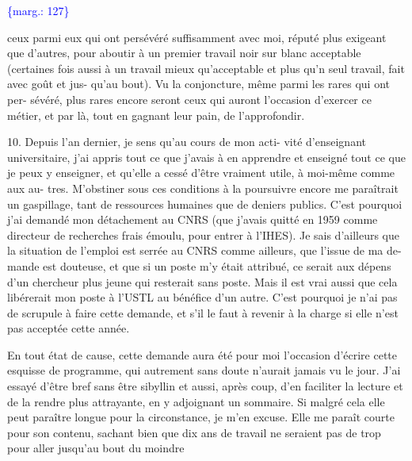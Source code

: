 \documentclass[11pt]{article}
\newcommand{\scanpage}[1]{\par\bigskip\noindent{\small\sffamily[scan #1]}\par}
\newcommand{\mspage}[1]{{\small\sffamily[p.\,#1]}}
\let\over\relax
\newcommand{\over}[2]{\textcolor{gray}{#1}\textcolor{blue}{\ensuremath{^{\!\nearrow}}#2}}
\newcommand{\margin}[1]{\textcolor{blue}{\{\textsf{marg.:} #1\}}}
\newcommand{\unsure}[1]{[#1?]}
\begin{document}
\margin{127}

\clearpage
\scanpage{119/128}
\mspage{50}

ceux parmi eux qui ont persévéré suffisamment avec moi, réputé
plus exigeant que d'autres, pour aboutir à un premier travail
noir sur blanc acceptable (certaines fois aussi à un travail mieux
qu'acceptable et plus qu'\over{e}{\unsure{u}}n seul travail, fait avec goût et jus-%
qu'au bout). Vu la conjoncture, même parmi les rares qui ont per-%
sévéré, plus rares encore seront ceux qui auront l'occasion
d'exercer ce métier, et par là, tout en gagnant leur pain, de
l'approfondir.

10. Depuis l'an dernier, je sens qu'au cours de mon acti-%
vité d'enseignant universitaire, j'ai appris tout ce que j'avais
à en apprendre et enseigné tout ce que je peux y enseigner, et
qu'elle a cessé d'être vraiment utile, à moi-même comme aux au-%
tres. M'obstiner sous ces conditions à la poursuivre encore me
paraîtrait un gaspillage, tant de ressources humaines que de deniers
publics. C'est pourquoi j'ai demandé mon détachement au CNRS (que
j'avais quitté en 1959 comme directeur de recherches frais émoulu,
pour entrer à l'IHES). Je sais d'ailleurs que la situation de
l'emploi est serrée au CNRS comme ailleurs, que l'issue de ma de-%
mande est douteuse, et que si un poste m'y était attribué, ce serait
aux dépens d'un chercheur plus jeune qui resterait sans poste.
Mais il est vrai aussi que cela libérerait mon poste à l'USTL au
bénéfice d'un autre. C'est pourquoi je n'ai pas de scrupule à
faire cette demande, et s'il le faut à revenir à la charge si elle
n'est pas acceptée cette année.

En tout état de cause, cette demande aura été pour moi
l'occasion d'écrire cette esquisse de programme, qui autrement sans
doute n'aurait jamais vu le jour. J'ai essayé d'être bref sans être
sibyllin et aussi, après coup, d'en faciliter la lecture et de
la rendre plus attrayante, en y adjoignant un sommaire. Si malgré
cela elle peut paraître longue pour la circonstance, je m'en excuse.
Elle me paraît courte pour son contenu, sachant bien que dix ans de
travail ne seraient pas de trop pour aller jusqu'au bout du moindre
\end{document}
